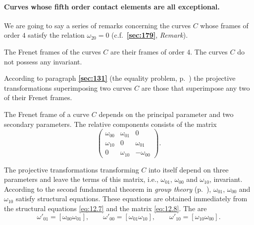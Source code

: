 \documentclass[leqno,11pt]{book}
\numberwithin{equation}{chapter}
\theoremstyle{shape1}
\theoremstyle{shapesmall}
\newcommand{\fsref}[1]{{\rm\textsection\textbf{\ref{sec:#1}}}}
\begin{document}
\paragraph{Curves whose fifth order contact elements are all exceptional.}
\label{sec:182}
We are going to say a series of remarks concerning the curves $C$ whose frames of order $4$ satisfy the relation $\omega_{20}=0$ (c.f.~\fsref{179}, \emph{Remark}).

The Frenet frames of the curves $C$ are their frames of order $4$. The curves $C$ do not possess any invariant.

According to paragraph \fsref{131} (the equality problem, p.~\pageref{sec:131}) the projective transformations superimposing two curves $C$ are those that superimpose any two of their Frenet frames.

The Frenet frame of a curve $C$ depends on the principal parameter and two secondary parameters. The relative components consists of the matrix
\begin{equation}
  \label{eq:12.8}
  \begin{pmatrix}
    \omega_{00}&\omega_{01}&0\\
    \omega_{10}&0&\omega_{01}\\
    0&\omega_{10}&-\omega_{00}
  \end{pmatrix}.
\end{equation}

The projective transformations transforming $C$ into itself depend on three parameters and leave the terms of this matrix, i.e., $\omega_{01}$, $\omega_{00}$ and $\omega_{10}$, invariant. According to the second fundamental theorem in \emph{group theory} (p.~\pageref{sec:165}), $\omega_{01}$, $\omega_{00}$ and $\omega_{10}$ satisfy structural equations. These equations are obtained immediately from the structural equations \eqref{eq:12.7} and the matrix \eqref{eq:12.8}. The are
\begin{equation}
  \label{eq:12.9}
  \omega'_{01}=[\omega_{00}\omega_{01}],\qquad\omega'_{00}=[\omega_{01}\omega_{10}],\qquad\omega'_{10}=[\omega_{10}\omega_{00}].
\end{equation}
\end{document}
